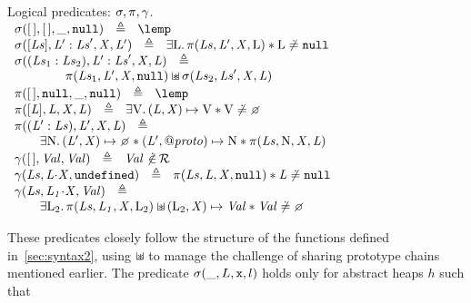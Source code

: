 \documentclass{article}
\begin{document}
\begin{display}{Logical predicates: $\sigma,\pi,\gamma$.}
$\begin{array}{l}
        \scope({\emptylist},{\emptylist},\_,\nil) ~~\triangleq~~ \lemp\\
        \scope([{\List}],\E{L}':\E{Ls}',\E{X},\E{L}') ~~\triangleq~~ 
         \exists\V{L}\st\proto({\List},\E{L}', \E{X}, \V{L}) \sep \V{L}\not\doteq\nil \\
          \scope(({\Lista}:{\Listb}),\E{L}':\E{Ls}',\E{X},\E{L}) ~~\triangleq~~ \\
  \qquad\qquad\proto({\Lista},\E{L}',\E{X},\nil) \sepish {}
 \scope({\Listb},\E{Ls}',\E{X},\E{L})
\end{array}$\Gap\\[\gap]
%
$\begin{array}{l}
  \proto({\emptylist},\nil,\_,\nil) ~~\triangleq~~ \lemp\\
  \proto([\E{L}],\E{L},\E{X},\E{L}) ~~\triangleq~~ 
 \exists\LVAL\st(\E{L},\E{X})\pointsto \LVAL \sep \LVAL\not\doteq\none\\
  \proto((\E{L}':{\List}),\E{L}',\E{X},\E{L}) ~~\triangleq~~\\
\qquad          \exists\V{N}\st
    (\E{L}',\E{X})\pointsto\none \sep {}
    (\E{L}',\protop)\pointsto \V{N} \sep {}
    \proto({\List},\V{N},\E{X},\E{L})
\end{array}$\Gap\\[\gap]
%
$\begin{array}{l}
  \getValue({\emptylist}, \E{Val},\E{Val}) ~~\triangleq~~ \E{Val} \notdotin\refs \\
  \getValue({\List}, \E{L}\sv\E{X}, \und) ~~\triangleq~~ \proto({\List},\E{L},\E{X}, \nil) \sep \E{L}\not\doteq\nil \\
  \getValue({\List}, \E{L_1}\sv\E{X}, \E{Val})~~\triangleq~~\\
\qquad\exists\V{L_2}\st \proto({\List},\E{L_1},\E{X}, \V{L_2}) \sepish {}         (\V{L_2},\E{X})\pointsto\E{Val} \sep \E{Val}\not\doteq\none\\
\end{array}$
\end{display}
These predicates closely follow the structure of the functions defined
in~\ref{sec:syntax2}, using $\mathbin{\sqcup\mkern-10mu*}$ to manage the challenge of
sharing prototype chains mentioned earlier. The predicate
$\sigma(\_,L,\mbox{\texttt{{\upshape x}}},l)$ holds only for abstract heaps $h$ such that
\end{document}
